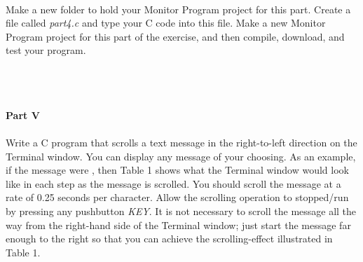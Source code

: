 \documentclass[epsfig,10pt,fullpage]{article}
\begin{document}
~\\
\noindent
Make a new folder to hold your Monitor Program project for this part. Create a
file called {\it part4.c} and type your C code into this file.  Make a new Monitor Program 
project for this part of the exercise, and then compile, download, and test your program. 

~\\
~\\
~\\
\noindent
{\bf Part V}
~\\
~\\
\noindent
Write a C program that scrolls a text message in the right-to-left direction on the 
Terminal window. You can display any message of your choosing. As an example, if the 
message were , then Table 1 shows what the Terminal window would 
look like in each step as the message is scrolled. You should scroll the message at a rate of 
0.25 seconds per character. Allow the scrolling operation to stopped/run by pressing
any pushbutton {\it KEY}.
It is not necessary to scroll the message all the way from the right-hand side of the
Terminal window; just start the message far enough to the right so that you can achieve 
the scrolling-effect illustrated in Table 1.
\end{document}
